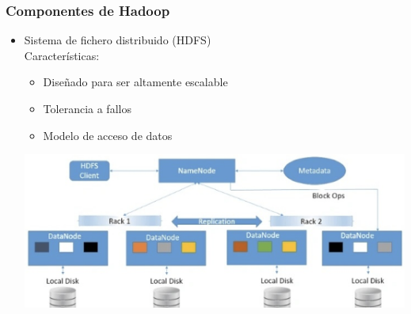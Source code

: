 \documentclass[
10pt, %
aspectratio=169, %
]{beamer}
\begin{document}
	\begin{frame}
		
		\frametitle{Componentes de Hadoop}
		
		\begin{itemize}
			\item Sistema de fichero distribuido (HDFS)\\[2mm]
			
			Características:
			\begin{itemize}
				
				\item Diseñado para ser altamente escalable 
				
				\item Tolerancia a fallos
				
				\item Modelo de acceso de datos \\[2mm]
				
			\end{itemize}
			
			\centering
			\includegraphics[scale=0.24]{hdfs.png}
			

\end{itemize}
\end{frame}
\end{document}
